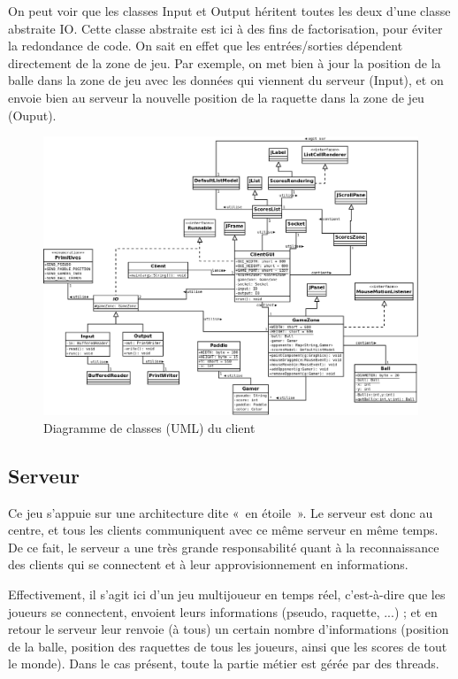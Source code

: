 \documentclass[a4paper,12pt]{article}
\begin{document}
On peut voir que les classes Input et Output héritent toutes les deux d'une classe abstraite IO. Cette classe abstraite est ici à des fins de factorisation, pour éviter la redondance de code. On sait en effet que les entrées/sorties dépendent directement de la zone de jeu. Par exemple, on met bien à jour la position de la balle dans la zone de jeu avec les données qui viennent du serveur (Input), et on envoie bien au serveur la nouvelle position de la raquette dans la zone de jeu (Ouput).

\begin{landscape}
  \begin{figure}
  \begin{center}
    \includegraphics[scale=.4]{diagramme-client.png}
  \end{center}
  \caption{Diagramme de classes (UML) du client}
  \end{figure}
\end{landscape}

\subsection{Serveur}

Ce jeu s'appuie sur une architecture dite «~en étoile~». Le serveur est donc au centre, et tous les clients communiquent avec ce même serveur en même temps. De ce fait, le serveur a une très grande responsabilité quant à la reconnaissance des clients qui se connectent et à leur approvisionnement en informations.

Effectivement, il s'agit ici d'un jeu multijoueur en temps réel, c'est-à-dire que les joueurs se connectent, envoient leurs informations (pseudo, raquette, ...) ; et en retour le serveur leur renvoie (à tous) un certain nombre d'informations (position de la balle, position des raquettes de tous les joueurs, ainsi que les scores de tout le monde). Dans le cas présent, toute la partie métier est gérée par des threads. 
\end{document}
